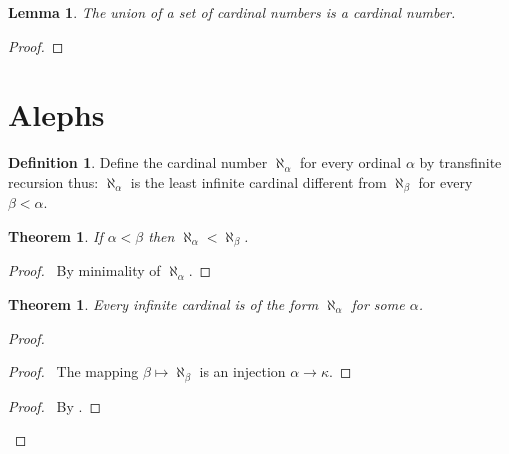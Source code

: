 \documentclass{article}
\let\qed\relax
\newtheorem{lemma}[axiom]{Lemma}
\newtheorem{theorem}[axiom]{Theorem}
\theoremstyle{definition}
\newtheorem{definition}[axiom]{Definition}
\begin{document}
    \begin{lemma}
        The union of a set of cardinal numbers is a cardinal number.
    \end{lemma}

    \begin{proof}
        \pf
        \qed
    \end{proof}
    \section{Alephs}

    \begin{definition}
        Define the cardinal number $\aleph_\alpha$ for every ordinal $\alpha$ by transfinite recursion thus:
        $\aleph_\alpha$ is the least infinite cardinal different from $\aleph_\beta$ for every $\beta < \alpha$.
    \end{definition}

    \begin{theorem}
        If $\alpha < \beta$ then $\aleph_\alpha < \aleph_\beta$.
    \end{theorem}

    \begin{proof}
        \pf\ By minimality of $\aleph_\alpha$. \qed
    \end{proof}

    \begin{theorem}
        Every infinite cardinal is of the form $\aleph_\alpha$ for some $\alpha$.
    \end{theorem}

    \begin{proof}
        \pf
        \begin{proof}
            \pf\ The mapping $\beta \mapsto \aleph_\beta$ is an injection $\alpha \rightarrow \kappa$.
        \end{proof}
        \begin{proof}
            \pf\ By .
        \end{proof}
        \qed
    \end{proof}
\end{document}

